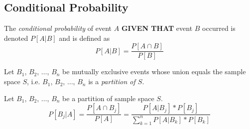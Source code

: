 	\subsection{Conditional Probability} \label{subsec:Conditional Probability}
		\begin{definition} \label{def:Conditional Probability}
			The \emph{conditional probability} of event $A$ \textbf{GIVEN THAT} event $B$ occurred is denoted $P \left[ A \vert B \right]$ and is defined as
			\begin{equation} 
				P \left[ A \vert B \right] = \frac{P \left[ A \cap B \right]}{P \left[ B \right]}
			\end{equation}
		\end{definition}
		\begin{theorem}
			Let $B_{1}$, $B_{2}$, $\ldots$, $B_{n}$ be mutually exclusive events whose union equals the sample space $S$, i.e. $B_{1}$, $B_{2}$, $\ldots$, $B_{n}$ is a \emph{partition of $S$}.
		\end{theorem}
		\begin{definition}
			Let $B_{1}$, $B_{2}$, $\ldots$, $B_{n}$ be a partition of sample space $S$.
			\begin{equation}
				P \left[ B_{j} \vert A \right] = \frac{P \left[ A \cap B_{j} \right]}{P \left[ A \right]} = \frac{P \left[ A \vert B_{j} \right] * P \left[ B_{j} \right]}{\sum_{k=1}^{n} P \left[ A \vert B_{k} \right] * P \left[ B_{k} \right]}
			\end{equation}
		\end{definition}
	
